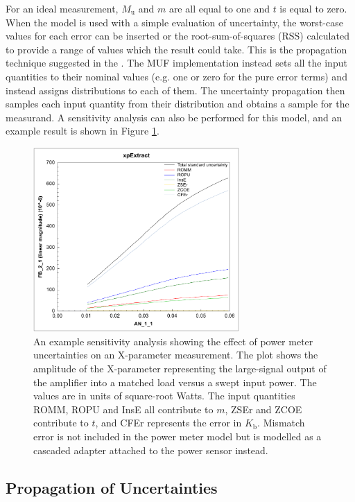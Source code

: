 \documentclass[../thesis/thesis.tex]{subfiles}
\begin{document}
\begin{refsection}
For an ideal measurement, $M_\textrm{u}$ and $m$ are all equal to one and $t$ is equal to zero. When the model is used with a simple evaluation of uncertainty, the worst-case values for each error can be inserted or the root-sum-of-squares (RSS) calculated to provide a range of values which the result could take. This is the propagation technique suggested in the \cite{Keysight_2017}. The MUF implementation instead sets all the input quantities to their nominal values (e.g. one or zero for the pure error terms) and instead assigns distributions to each of them. The uncertainty propagation then samples each input quantity from their distribution and obtains a sample for the measurand. A sensitivity analysis can also be performed for this model, and an example result is shown in Figure \ref{ch4_fig_pmsens}.

\begin{figure}
	\centering
	\includegraphics[width=0.7\textwidth]{pmsens.png}
	\caption{An example sensitivity analysis showing the effect of power meter uncertainties on an X-parameter measurement. The plot shows the amplitude of the X-parameter representing the large-signal output of the amplifier into a matched load versus a swept input power. The values are in units of square-root Watts. The input quantities ROMM, ROPU and InsE all contribute to $m$, ZSEr and ZCOE contribute to $t$, and CFEr represents the error in $K_\textrm{b}$. Mismatch error is not included in the power meter model but is modelled as a cascaded adapter attached to the power sensor instead.}
	\label{ch4_fig_pmsens}
\end{figure}

\subsection{Propagation of Uncertainties}


\end{refsection}
\end{document}

